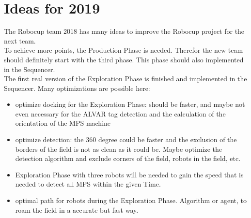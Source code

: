 \section{Ideas for 2019}

The Robocup team 2018 has many ideas to improve the Robocup project for the next team.\\

To achieve more points, the Production Phase is needed. Therefor the new team should definitely start with the third phase. This phase should also implemented in the Sequencer. \\

The first real version of the Exploration Phase is finished and implemented in the Sequencer. Many optimizations are possible here:
\begin{itemize}
\item optimize docking for the Exploration Phase: should be faster, and maybe not even necessary for the ALVAR tag detection and the calculation of the orientation of the MPS machine
\item optimize detection: the 360 degree could be faster and the exclusion of the borders of the field is not as clean as it could be. Maybe optimize the detection algorithm and exclude corners of the field, robots in the field, etc.
\item Exploration Phase with three robots will be needed to gain the speed that is needed to detect all MPS within the given Time.
\item optimal path for robots during the Exploration Phase. Algorithm or agent, to roam the field in a accurate but fast way.
\end{itemize}
